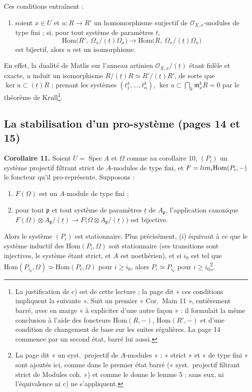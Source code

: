 \documentclass[11pt,a4paper]{article}
\begin{document}
Ces conditions entraînent :
\begin{enumerate}
\item[c)] soient $x \in U$ et $u \colon R \to R'$ un homomorphisme surjectif de
$\mathcal{O}_{X,x}$-modules de type fini ; si, pour tout système de paramètres
$\underline{t}$,
\[
  \mathrm{Hom}\bigl(R',\ \Omega_x/(\underline{t})\Omega_x\bigr) \to
  \mathrm{Hom}\bigl(R,\ \Omega_x/(\underline{t})\Omega_x\bigr)
\]
est bijectif, alors $u$ est un isomorphisme.
\end{enumerate}
En effet, la dualité de Matlis sur l'anneau artinien
$\mathcal{O}_{X,x}/(\underline{t})$ étant fidèle et exacte, $u$ induit un
isomorphisme $R/(\underline{t})R \simeq R'/(\underline{t})R'$, de sorte que
$\ker u \subset (\underline{t})R$ ; prenant les systèmes $(t_1^k, \ldots,
t_n^k)$, $\ker u \subset \bigcap_k \mathfrak{m}_x^k R = 0$ par le théorème de
Krull\footnote{La justification de c) est de cette lecture ; la page dit
« ces conditions impliquent la suivante ». Suit un premier « Cor.\ Main 11 »,
entièrement barré, avec en marge « à expliciter d'une autre façon » : il
formulait la même conclusion à l'aide des foncteurs $\mathrm{Hom}(R, -)$,
$\mathrm{Hom}(R', -)$ et d'une condition de changement de base sur les suites
régulières. La page 14 commence par un second état, barré lui aussi.}.

\subsection*{La stabilisation d'un pro-système (pages 14 et 15)}

\textbf{Corollaire 11.} Soient $U = \operatorname{Spec} A$ et $\Omega$ comme au
corollaire 10, $(P_i)$ un système projectif filtrant strict de $A$-modules de
type fini, et $F = \varinjlim_i \mathrm{Hom}(P_i, -)$ le foncteur qu'il
pro-représente. Supposons :
\begin{enumerate}
\item[(i)] $F(\Omega)$ est un $A$-module de type fini ;
\item[(ii)] pour tout $\mathfrak{p}$ et tout système de paramètres
$\underline{t}$ de $A_{\mathfrak{p}}$, l'application canonique
$F(\Omega) \otimes A_{\mathfrak{p}}/(\underline{t}) \to
F\bigl(\Omega \otimes A_{\mathfrak{p}}/(\underline{t})\bigr)$ est bijective.
\end{enumerate}
Alors le système $(P_i)$ est stationnaire. Plus précisément, (i) équivaut à ce que
le système inductif des $\mathrm{Hom}(P_i, \Omega)$ soit stationnaire (ses
transitions sont injectives, le système étant strict, et $A$ est
noethérien), et si $i_0$ est tel que $\mathrm{Hom}(P_{i_0}, \Omega) \simeq
\mathrm{Hom}(P_i, \Omega)$ pour $i \geq i_0$, alors $P_i \simeq P_{i_0}$ pour
$i \geq i_0$\footnote{La page dit « un syst.\ projectif de $A$-modules » ;
« strict » et « de type fini » sont ajoutés ici, comme dans le premier état
barré (« syst.\ projectif filtrant strict de Modules coh. ») et comme le donne
le lemme 5 : sans eux, ni l'équivalence ni c) ne s'appliquent.}.
\end{document}
